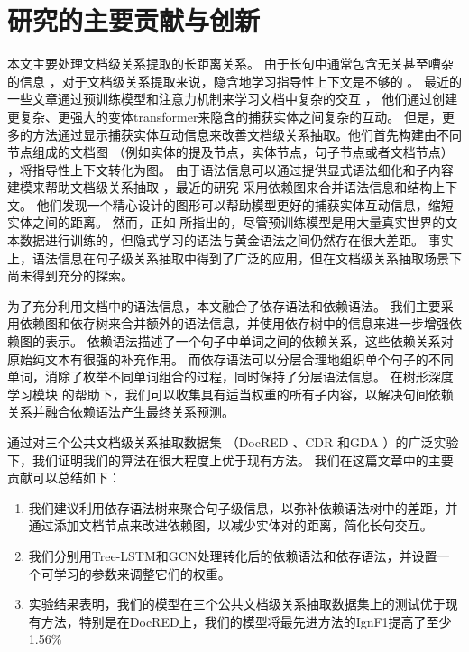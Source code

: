 \documentclass[bachelor]{thesis-uestc}
\begin{document}
\section{研究的主要贡献与创新}
本文主要处理文档级关系提取的长距离关系。
由于长句中通常包含无关甚至嘈杂的信息 \cite{gupta2019neural}，对于文档级关系提取来说，隐含地学习指导性上下文是不够的 \cite{bai-etal-2021-syntax}。
最近的一些文章通过预训练模型和注意力机制来学习文档中复杂的交互 \cite{huang-etal-2021-three, y2020-coreferential, zhou2021document}， 他们通过创建更复杂、更强大的变体transformer来隐含的捕获实体之间复杂的互动。
但是，更多的方法通过显示捕获实体互动信息来改善文档级关系抽取。他们首先构建由不同节点组成的文档图 （例如实体的提及节点，实体节点，句子节点或者文档节点） \cite{GAIN, liu2023document}，将指导性上下文转化为图。
由于语法信息可以通过提供显式语法细化和子内容建模来帮助文档级关系抽取 \cite{duan-etal-2022-just}，最近的研究 \cite{sahu2019inter, SagDRE} 采用依赖图来合并语法信息和结构上下文。
他们发现一个精心设计的图形可以帮助模型更好的捕获实体互动信息，缩短实体之间的距离。
然而，正如 \cite{sundararaman2019syntax, bai-etal-2021-syntax}所指出的，尽管预训练模型是用大量真实世界的文本数据进行训练的，但隐式学习的语法与黄金语法之间仍然存在很大差距。
事实上，语法信息在句子级关系抽取中得到了广泛的应用\cite{xu-etal-2016-improved, qin-etal-2021-relation}，但在文档级关系抽取场景下尚未得到充分的探索。\par

为了充分利用文档中的语法信息，本文融合了依存语法和依赖语法。
我们主要采用依赖图和依存树来合并额外的语法信息，并使用依存树中的信息来进一步增强依赖图的表示。
依赖语法描述了一个句子中单词之间的依赖关系，这些依赖关系对原始纯文本有很强的补充作用。
而依存语法可以分层合理地组织单个句子的不同单词，消除了枚举不同单词组合的过程，同时保持了分层语法信息。
在树形深度学习模块 \cite{duan-etal-2022-just} 的帮助下，我们可以收集具有适当权重的所有子内容，以解决句间依赖关系并融合依赖语法产生最终关系预测。\par


通过对三个公共文档级关系抽取数据集 （DocRED \cite{DOCRED}、CDR \cite{li2016biocreative} 和GDA \cite{GDA} ）的广泛实验下，我们证明我们的算法在很大程度上优于现有方法。
我们在这篇文章中的主要贡献可以总结如下：
\begin{enumerate}
    \item 我们建议利用依存语法树来聚合句子级信息，以弥补依赖语法树中的差距，并通过添加文档节点来改进依赖图，以减少实体对的距离，简化长句交互。
    \item 我们分别用Tree-LSTM和GCN处理转化后的依赖语法和依存语法，并设置一个可学习的参数来调整它们的权重。
    \item 实验结果表明，我们的模型在三个公共文档级关系抽取数据集上的测试优于现有方法，特别是在DocRED上，我们的模型将最先进方法的IgnF1提高了至少1.56\%
\end{enumerate}
\end{document}

